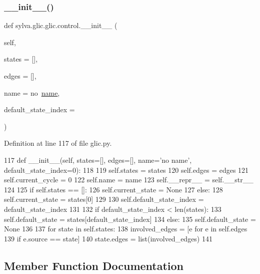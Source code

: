 \subsubsection{\texorpdfstring{\+\_\+\+\_\+init\+\_\+\+\_\+()}{\_\_init\_\_()}}
{\footnotesize\ttfamily def sylva.\+glic.\+glic.\+control.\+\_\+\+\_\+init\+\_\+\+\_\+ (\begin{DoxyParamCaption}\item[{}]{self,  }\item[{}]{states = {\ttfamily \mbox{[}\mbox{]}},  }\item[{}]{edges = {\ttfamily \mbox{[}\mbox{]}},  }\item[{}]{name = {\ttfamily \textquotesingle{}no~\hyperlink{classsylva_1_1glic_1_1glic_1_1control_a95f657f58c1799fe7004653fe77ce106}{name}\textquotesingle{}},  }\item[{}]{default\+\_\+state\+\_\+index = {} }\end{DoxyParamCaption})}



Definition at line 117 of file glic.\+py.


\begin{DoxyCode}
117     \textcolor{keyword}{def }\_\_init\_\_(self, states=[], edges=[], name='no name', default\_state\_index=0):
118 
119       self.states = states
120       self.edges = edges
121       self.current\_cycle = 0
122       self.name = name
123       self.\_\_repr\_\_ = self.\_\_str\_\_
124 
125       \textcolor{keywordflow}{if} self.states == []:
126         self.current\_state = \textcolor{keywordtype}{None}
127       \textcolor{keywordflow}{else}:
128         self.current\_state = states[0]
129 
130       self.default\_state\_index = default\_state\_index
131 
132       \textcolor{keywordflow}{if} default\_state\_index < len(states):
133         self.default\_state = states[default\_state\_index]
134       \textcolor{keywordflow}{else}:
135         self.default\_state = \textcolor{keywordtype}{None}
136 
137       \textcolor{keywordflow}{for} state \textcolor{keywordflow}{in} self.states:
138         involved\_edges = [e \textcolor{keywordflow}{for} e \textcolor{keywordflow}{in} self.edges
139                           \textcolor{keywordflow}{if} e.source == state]
140         state.edges = list(involved\_edges)
141 
\end{DoxyCode}


\subsection{Member Function Documentation}
\mbox{\label{classsylva_1_1glic_1_1glic_1_1control_a930531b0935008d702bf22e2307283c6}} 
